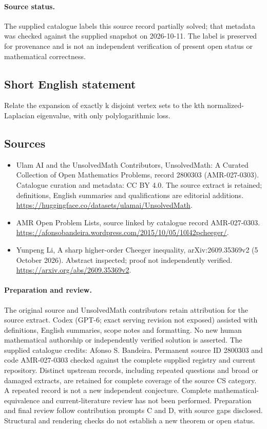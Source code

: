 \documentclass[11pt]{article}
\begin{document}
\paragraph{Source status.}
The supplied catalogue labels this source record partially solved; that metadata was checked against the supplied snapshot on 2026-10-11. The label is preserved for provenance and is not an independent verification of present open status or mathematical correctness.
\subsection{Short English statement}
Relate the expansion of exactly k disjoint vertex sets to the kth normalized-Laplacian eigenvalue, with only polylogarithmic loss.
\subsection{Sources}
\begin{itemize}
\item[\hypertarget{source:2800303:1}{S1}] Ulam AI and the UnsolvedMath Contributors, UnsolvedMath: A Curated Collection of Open Mathematics Problems, record 2800303 (AMR-027-0303). Catalogue curation and metadata: CC BY 4.0. The source extract is retained; definitions, English summaries and qualifications are editorial additions.
\url{https://huggingface.co/datasets/ulamai/UnsolvedMath}.
\item[\hypertarget{source:2800303:2}{S2}] AMR Open Problem Lists, source linked by catalogue record AMR-027-0303.
\url{https://afonsobandeira.wordpress.com/2015/10/05/10l42pcheeger/}.
\item[\hypertarget{source:2800303:3}{S3}] Yunpeng Li, A sharp higher-order Cheeger inequality, arXiv:2609.35369v2 (5 October 2026). Abstract inspected; proof not independently verified.
\url{https://arxiv.org/abs/2609.35369v2}.
\end{itemize}
\paragraph{Preparation and review.}
The original source and UnsolvedMath contributors retain attribution for the source extract. Codex (GPT-6; exact serving revision not exposed) assisted with definitions, English summaries, scope notes and formatting. No new human mathematical authorship or independently verified solution is asserted. The supplied catalogue credits: Afonso S. Bandeira. Permanent source ID 2800303 and code AMR-027-0303 checked against the complete supplied registry and current repository. Distinct upstream records, including repeated questions and broad or damaged extracts, are retained for complete coverage of the source CS category. A repeated record is not a new independent conjecture. Complete mathematical-equivalence and current-literature review has not been performed. Preparation and final review follow contribution prompts C and D, with source gaps disclosed. Structural and rendering checks do not establish a new theorem or open status.
\label{end:2800303}
\end{document}
